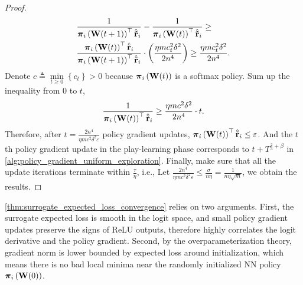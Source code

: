 \begin{proof}
\begin{equation*}
\begin{split}
    &\frac{1}{{\boldsymbol{\pi}}_i\left( {\mathbf{W}}(t+1) \right)^\top \hat{{\tilde{\mathbf{r}}}}_i} - \frac{1}{{\boldsymbol{\pi}}_i\left( {\mathbf{W}}(t) \right)^\top \hat{{\tilde{\mathbf{r}}}}_i} \ge \\
    &\frac{{\boldsymbol{\pi}}_i\left( {\mathbf{W}}(t) \right)^\top \hat{{\tilde{\mathbf{r}}}}_i}{{\boldsymbol{\pi}}_i\left( {\mathbf{W}}(t+1) \right)^\top \hat{{\tilde{\mathbf{r}}}}_i} \cdot \left( \frac{\eta m c_t^2 \delta^2}{2n^4} \right) \ge \frac{\eta m c_t^2 \delta^2}{2n^4}.
\end{split}
\end{equation*}
Denote $c \triangleq \min\limits_{t \ge 0}{\left\{ c_t \right\}} > 0$ because ${\boldsymbol{\pi}}_i\left( {\mathbf{W}}(t) \right)$ is a softmax policy.
Sum up the inequality from $0$ to $t$,
\begin{equation*}
\begin{split}
    \frac{1}{{\boldsymbol{\pi}}_i\left( {\mathbf{W}}(t) \right)^\top \hat{{\tilde{\mathbf{r}}}}_i} \ge \frac{\eta m c^2 \delta^2}{2n^4} \cdot t.
\end{split}
\end{equation*}
Therefore, after $t =  \frac{2n^4}{\eta m c^2 \delta^2 \varepsilon}$ policy gradient updates, ${\boldsymbol{\pi}}_i\left( {\mathbf{W}}(t) \right)^\top \hat{{\tilde{\mathbf{r}}}}_i \le \varepsilon$. And the $t$th policy gradient update in the play-learning phase corresponds to $t + T^{\frac{2}{3} + \beta}$ in \cref{alg:policy_gradient_uniform_exploration}. Finally, make sure that all the update iterations terminate within $\frac{\tau}{\eta}$, i.e.,
Let $\frac{2n^4}{\eta m c^2 \delta^2 \varepsilon} \le \frac{\sigma}{n \eta} = \frac{1}{n \eta \sqrt{m}}$, we obtain the results.
\end{proof}

\cref{thm:surrogate_expected_loss_convergence} relies on two arguments. First, the surrogate expected loss is smooth in the logit space, and small policy gradient updates preserve the signs of ReLU outputs, therefore highly correlates the logit derivative and the policy gradient. Second, by the overparameterization theory, gradient norm is lower bounded by expected loss around initialization, which means there is no bad local minima near the randomly initialized NN policy ${\boldsymbol{\pi}}_i\left( {\mathbf{W}}(0) \right)$.

